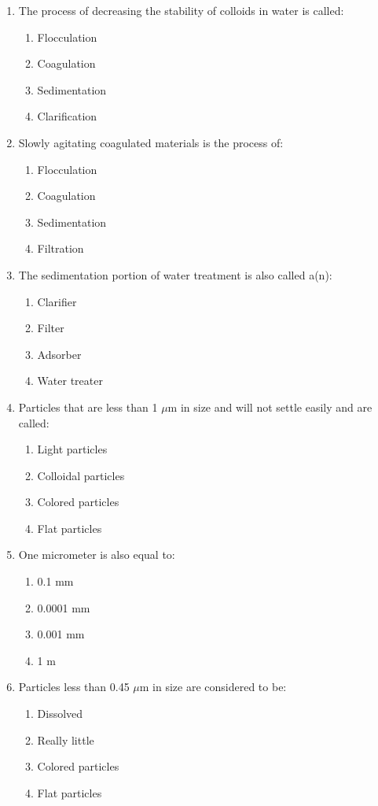 \begin{enumerate}
\item The process of decreasing the stability of colloids in water is called:
\begin{enumerate}
\item Flocculation
\item Coagulation
\item Sedimentation
\item Clarification
\end{enumerate}

\item Slowly agitating coagulated materials is the process of:
\begin{enumerate}
\item Flocculation
\item Coagulation
\item Sedimentation
\item Filtration
\end{enumerate}

\item The sedimentation portion of water treatment is also called a(n):
\begin{enumerate}
\item Clarifier
\item Filter
\item Adsorber
\item Water treater
\end{enumerate}

\item Particles that are less than 1 $\mu\text{m}$ in size and will not settle easily and are called:
\begin{enumerate}
\item Light particles
\item Colloidal particles
\item Colored particles
\item Flat particles
\end{enumerate}

\item One micrometer is also equal to:
\begin{enumerate}
\item 0.1 mm
\item 0.0001 mm
\item 0.001 mm
\item 1 m
\end{enumerate}

\item Particles less than 0.45 $\mu\text{m}$ in size are considered to be:
\begin{enumerate}
\item Dissolved
\item Really little
\item Colored particles
\item Flat particles
\end{enumerate}


\end{enumerate}
